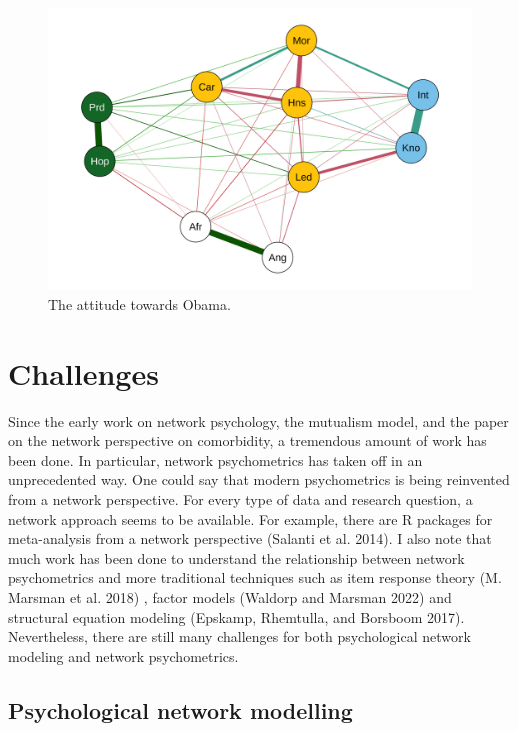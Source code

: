 \documentclass[
  a4paper,
  DIV=11,
  numbers=noendperiod]{scrreprt}
\begin{document}
\begin{figure}

{\centering \includegraphics{media/ch6/fig-ch6-img19-old-88.png}

}

\caption{\label{fig-ch6-img19-old-88}The attitude towards Obama.}

\end{figure}

\hypertarget{sec-Challenges}{%
\section{Challenges}\label{sec-Challenges}}

Since the early work on network psychology, the mutualism model, and the
paper on the network perspective on comorbidity, a tremendous amount of
work has been done. In particular, network psychometrics has taken off
in an unprecedented way. One could say that modern psychometrics is
being reinvented from a network perspective. For every type of data and
research question, a network approach seems to be available. For
example, there are R packages for meta-analysis from a network
perspective (Salanti et al. 2014). I also note that much work has been
done to understand the relationship between network psychometrics and
more traditional techniques such as item response theory (M. Marsman et
al. 2018) , factor models (Waldorp and Marsman 2022) and structural
equation modeling (Epskamp, Rhemtulla, and Borsboom 2017). Nevertheless,
there are still many challenges for both psychological network modeling
and network psychometrics.

\hypertarget{sec-Psychological-network-modelling}{%
\subsection{Psychological network
modelling}\label{sec-Psychological-network-modelling}}
\end{document}
